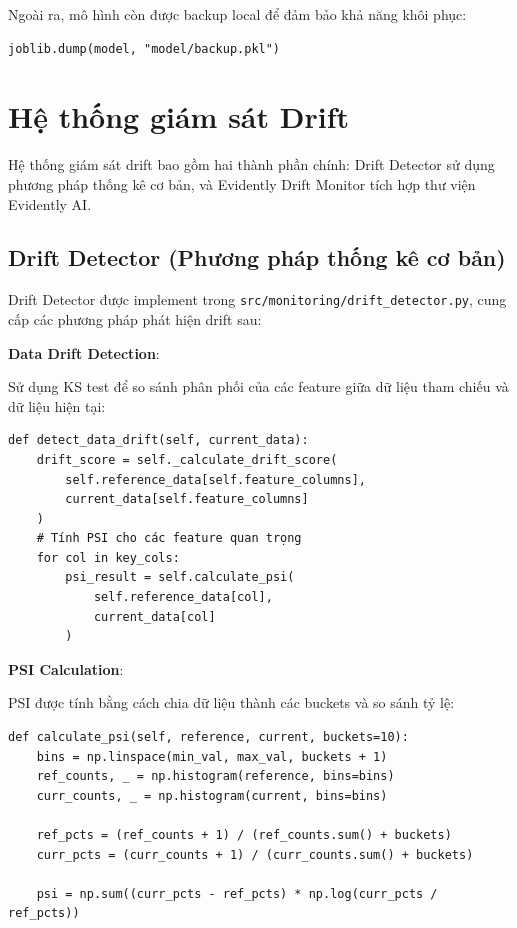Ngoài ra, mô hình còn được backup local để đảm bảo khả năng khôi phục:

\begin{verbatim}
joblib.dump(model, "model/backup.pkl")
\end{verbatim}

\section{Hệ thống giám sát Drift}

Hệ thống giám sát drift bao gồm hai thành phần chính: Drift Detector sử dụng phương pháp thống kê cơ bản, và Evidently Drift Monitor tích hợp thư viện Evidently AI.

\subsection{Drift Detector (Phương pháp thống kê cơ bản)}

Drift Detector được implement trong \texttt{src/monitoring/drift\_detector.py}, cung cấp các phương pháp phát hiện drift sau:

\textbf{Data Drift Detection}:

Sử dụng KS test để so sánh phân phối của các feature giữa dữ liệu tham chiếu và dữ liệu hiện tại:

\begin{verbatim}
def detect_data_drift(self, current_data):
    drift_score = self._calculate_drift_score(
        self.reference_data[self.feature_columns],
        current_data[self.feature_columns]
    )
    # Tính PSI cho các feature quan trọng
    for col in key_cols:
        psi_result = self.calculate_psi(
            self.reference_data[col],
            current_data[col]
        )
\end{verbatim}

\textbf{PSI Calculation}:

PSI được tính bằng cách chia dữ liệu thành các buckets và so sánh tỷ lệ:

\begin{verbatim}
def calculate_psi(self, reference, current, buckets=10):
    bins = np.linspace(min_val, max_val, buckets + 1)
    ref_counts, _ = np.histogram(reference, bins=bins)
    curr_counts, _ = np.histogram(current, bins=bins)
    
    ref_pcts = (ref_counts + 1) / (ref_counts.sum() + buckets)
    curr_pcts = (curr_counts + 1) / (curr_counts.sum() + buckets)
    
    psi = np.sum((curr_pcts - ref_pcts) * np.log(curr_pcts / ref_pcts))
\end{verbatim}

